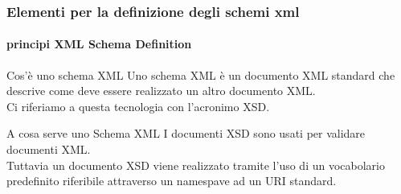











\begin{frame}
    \frametitle{Elementi per la definizione degli schemi xml}
    \framesubtitle{principi XML Schema Definition}
    \addtocounter{nframe}{1}

    \begin{block}{Cos'è uno schema XML}
        Uno schema XML è un documento XML standard che descrive come deve essere realizzato un altro documento XML.
        \\ Ci riferiamo a questa tecnologia con l'acronimo XSD.
    \end{block}
    
    \begin{block}{A cosa serve uno Schema XML}
     I documenti XSD sono usati per validare documenti XML. 
    \\ Tuttavia un documento XSD viene realizzato tramite l'uso di un vocabolario predefinito riferibile attraverso un namespave ad un URI standard.
    \end{block}

\end{frame}


